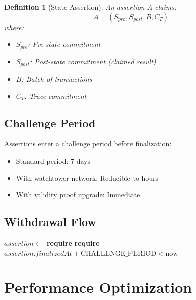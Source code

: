 \documentclass[11pt,a4paper]{article}
\newtheorem{definition}{Definition}
\begin{document}
\begin{definition}[State Assertion]
An assertion $A$ claims:
\begin{equation}
    A = (S_{pre}, S_{post}, B, C_T)
\end{equation}
where:
\begin{itemize}
    \item $S_{pre}$: Pre-state commitment
    \item $S_{post}$: Post-state commitment (claimed result)
    \item $B$: Batch of transactions
    \item $C_T$: Trace commitment
\end{itemize}
\end{definition}

\subsection{Challenge Period}

Assertions enter a challenge period before finalization:

\begin{itemize}
    \item Standard period: 7 days
    \item With watchtower network: Reducible to hours
    \item With validity proof upgrade: Immediate
\end{itemize}

\subsection{Withdrawal Flow}

\begin{algorithm}
\caption{Optimistic Withdrawal}
\begin{algorithmic}[1]
    \State $assertion \gets$ 
    \State \textbf{require} 
    \State \textbf{require} $assertion.finalizedAt + \text{CHALLENGE\_PERIOD} < \text{now}$
    \State {}
\EndProcedure
\end{algorithmic}
\end{algorithm}

\section{Performance Optimization}
\end{document}
